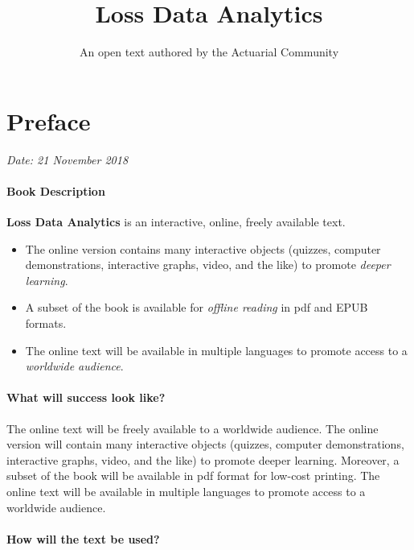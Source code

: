 \documentclass[]{book}
\title{Loss Data Analytics}
\author{An open text authored by the Actuarial Community}
\date{}
\providecommand{\tightlist}{%
  \setlength{\itemsep}{0pt}\setlength{\parskip}{0pt}}
\theoremstyle{definition}
\theoremstyle{definition}
\theoremstyle{definition}
\theoremstyle{remark}
\begin{document}
\maketitle

{
\setcounter{tocdepth}{2}
\tableofcontents
}
\chapter*{Preface}\label{preface}

\emph{Date: 21 November 2018}

\subsubsection*{Book Description}\label{book-description}

\textbf{Loss Data Analytics} is an interactive, online, freely available
text.

\begin{itemize}
\tightlist
\item
  The online version contains many interactive objects (quizzes,
  computer demonstrations, interactive graphs, video, and the like) to
  promote \emph{deeper learning}.
\item
  A subset of the book is available for \emph{offline reading} in pdf
  and EPUB formats.
\item
  The online text will be available in multiple languages to promote
  access to a \emph{worldwide audience}.
\end{itemize}

\subsubsection*{What will success look
like?}\label{what-will-success-look-like}

The online text will be freely available to a worldwide audience. The
online version will contain many interactive objects (quizzes, computer
demonstrations, interactive graphs, video, and the like) to promote
deeper learning. Moreover, a subset of the book will be available in pdf
format for low-cost printing. The online text will be available in
multiple languages to promote access to a worldwide audience.

\subsubsection*{How will the text be
used?}\label{how-will-the-text-be-used}
\end{document}
